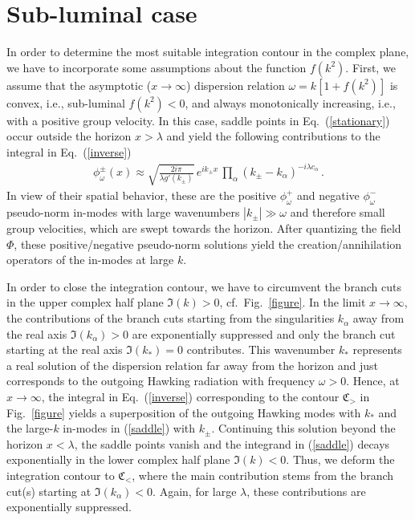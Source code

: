 \documentclass[12pt,aps,prl,showpacs,amssymb,nofootinbib,onecolumn]{revtex4-2}
\newcommand{\bea}{\begin{eqnarray}}
\newcommand{\ea}{\end{eqnarray}}
\begin{document}
\section{Sub-luminal case}\quad
%
In order to determine the most suitable integration contour in the
complex plane, we have to incorporate some assumptions about the
function $f(k^2)$. 
%
First, we assume that the asymptotic ($x\to\infty$) dispersion relation
$\omega=k[1+f(k^2)]$ is convex, i.e., sub-luminal $f(k^2)<0$, and 
always monotonically increasing, i.e., with a positive group velocity.  
%
In this case, saddle points in Eq.~(\ref{stationary}) occur outside
the horizon $x>\lambda$ and 
yield the following contributions to the integral in
Eq.~(\ref{inverse}) 
%
\bea
\label{saddle}
\phi_\omega^\pm(x)\approx\sqrt{\frac{2i\pi}{\lambda g'(k_\pm)}}\,
e^{ik_\pm x}\, 
\prod\limits_\alpha\left(k_\pm-k_\alpha\right)^{-i\lambda c_\alpha}
\,. 
\ea
%
In view of their spatial behavior, these are the positive
$\phi_\omega^+$ and negative $\phi_\omega^-$ pseudo-norm in-modes with
large wavenumbers $|k_\pm|\gg\omega$ and therefore small group
velocities, which are swept towards the horizon.  
%
After quantizing the field $\Phi$, these positive/negative pseudo-norm  
solutions yield the creation/annihilation operators of the in-modes at
large $k$.

In order to close the integration contour, we have to circumvent the
branch cuts in the upper complex half plane $\Im(k)>0$,
cf.~Fig.~\ref{figure}.   
%
In the limit $x\to\infty$, the contributions of the branch cuts
starting from the singularities $k_\alpha$ away from the real axis
$\Im(k_\alpha)>0$ are exponentially suppressed and only the branch cut
starting at the real axis $\Im(k_*)=0$ contributes. 
%
This wavenumber $k_*$ represents a real solution of the dispersion
relation far away from the horizon and just corresponds to the
outgoing Hawking radiation with frequency $\omega>0$. 
%
Hence, at $x\to\infty$, the integral in Eq.~(\ref{inverse})
corresponding to the contour ${\mathfrak C}_>$ in Fig.~\ref{figure} 
yields a superposition of the outgoing Hawking modes with $k_*$ and
the large-$k$ in-modes in (\ref{saddle}) with $k_\pm$. 
%
Continuing this solution beyond the horizon $x<\lambda$, the saddle
points vanish and the integrand in (\ref{saddle}) decays exponentially
in the lower complex half plane $\Im(k)<0$. 
%
Thus, we deform the integration contour to ${\mathfrak C}_<$, where
the main contribution stems from the branch cut(s) starting at 
$\Im(k_\alpha)<0$. 
%
Again, for large $\lambda$, these contributions are exponentially
suppressed.  
\end{document}
